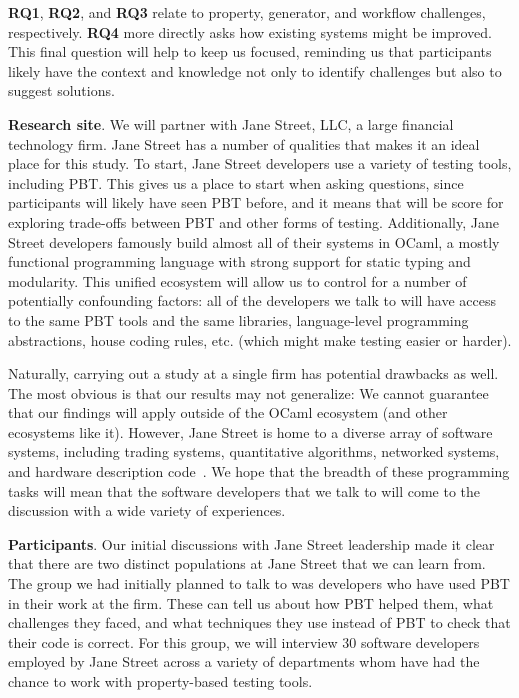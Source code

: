 {\bf RQ1}, {\bf RQ2}, and {\bf RQ3} relate to property,
generator, and workflow challenges, respectively.
{\bf RQ4} more directly asks how existing systems might
be improved. This final question will help to keep us focused,
reminding us that participants likely have the context and knowledge not
only to identify challenges but also to suggest
solutions.

\textbf{Research site}. We will partner with Jane Street, LLC, a large
financial technology firm.
Jane Street has a number of qualities that makes it an ideal place for
this study. To start, Jane Street developers use
a variety of testing tools, including PBT. This gives us a place to start
when asking questions, since participants will likely have seen PBT before,
and it means that will be score for exploring trade-offs between PBT and
other forms of testing.
Additionally, Jane Street developers famously build almost all of their
systems in OCaml, a mostly functional programming language with strong support
for static typing and modularity. This unified ecosystem
will allow
us to control for a number of potentially confounding factors: all of the
developers we talk to will have access to the same PBT tools and the same
libraries, language-level programming abstractions, house coding rules,
etc. (which might make testing easier or harder).

Naturally, carrying out a study at a single firm has potential drawbacks as
well. The most obvious is that our results may not generalize: We
cannot guarantee that our findings will apply outside of the OCaml ecosystem (and
other ecosystems like it). However, Jane Street is home to a diverse array of
software systems, including trading systems, quantitative
algorithms, networked systems, and hardware description code~\cite{signalsandthreads}.
We hope that the breadth of these programming tasks will mean that the software
developers that we talk to will come to the discussion with a wide variety of
experiences.

\textbf{Participants}.
Our initial discussions with Jane Street leadership made it clear that there are
two distinct populations at Jane Street that we can learn from. The group we had
initially planned to talk to was developers who have used PBT in
their work at the firm. These can tell us about how PBT helped them,
what challenges they faced, and what techniques they use instead of
PBT to check that their code is correct. For this group, we will interview 30 software developers employed by Jane Street across a variety of departments whom have had the chance to work with property-based testing tools.

